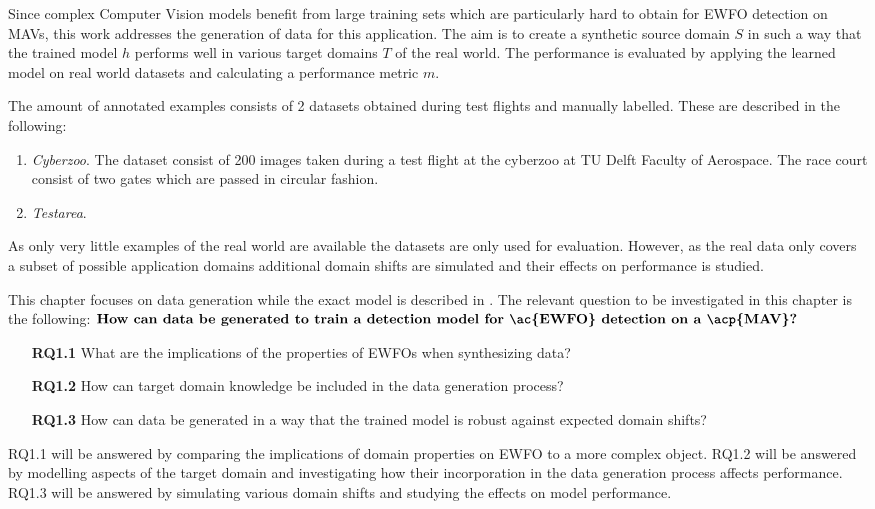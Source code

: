 Since complex Computer Vision models benefit from large training sets which are particularly hard to obtain for \ac{EWFO} detection on \acp{MAV}, this work addresses the generation of data for this application. The aim is to create a synthetic source domain $S$ in such a way that the trained model $h$ performs well in various target domains $T$ of the real world. The performance is evaluated by applying the learned model on real world datasets and calculating a performance metric $m$.

The amount of annotated examples consists of 2 datasets obtained during test flights and manually labelled. These are described in the following:

\begin{enumerate}
 \item \textit{Cyberzoo}. The dataset consist of 200 images taken during a test flight at the cyberzoo at TU Delft Faculty of Aerospace. The race court consist of two gates which are passed in circular fashion.
 \item \textit{Testarea}.  
\end{enumerate}

As only very little examples of the real world are available the datasets are only used for evaluation. However, as the real data only covers a subset of possible application domains additional domain shifts are simulated and their effects on performance is studied.

This chapter focuses on data generation while the exact model is described in .
The relevant question to be investigated in this chapter is the following:
$ 
\textbf{How can data be generated to train a detection model for \ac{EWFO} detection on a \acp{MAV}?} $

\begin{enumerate}
	\item[\textbf{RQ1.1}]What are the implications of the properties of \acp{EWFO} when synthesizing data?
	\item[\textbf{RQ1.2}]How can target domain knowledge be included in the data generation process?
	\item[\textbf{RQ1.3}]How can data be generated in a way that the trained model is robust against expected domain shifts?
\end{enumerate}

RQ1.1 will be answered by comparing the implications of domain properties on \ac{EWFO} to a more complex object. RQ1.2 will be answered by modelling aspects of the target domain and investigating how their incorporation in the data generation process affects performance. RQ1.3 will be answered by simulating various domain shifts and studying the effects on model performance.

